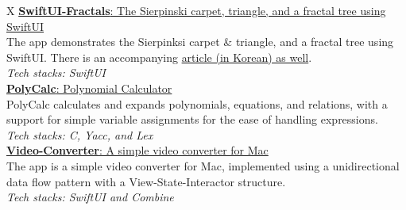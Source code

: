 \begin{tblr}{X}
  \href{https://github.com/Zeta611/SwiftUI-Fractals}{\textbf{SwiftUI-Fractals}: The Sierpinski carpet, triangle, and a fractal tree using SwiftUI}                                                                                                                                             \\
  The app demonstrates the Sierpinksi carpet \& triangle, and a fractal tree using SwiftUI. There is an accompanying \href{https://zetablog.io/posts/fractals-in-swiftui}{article (in Korean) as well}.                                                                                        \\
  \textit{Tech stacks: SwiftUI}                                                                                                                                                                                                                                                                \\[0.5\onelineskip]

  \href{https://github.com/Zeta611/polycalc}{\textbf{PolyCalc}: Polynomial Calculator}                                                                                                                                                                                                         \\
  PolyCalc calculates and expands polynomials, equations, and relations, with a support for simple variable assignments for the ease of handling expressions.                                                                                                                                  \\
  \textit{Tech stacks: C, Yacc, and Lex}                                                                                                                                                                                                                                                       \\[0.5\onelineskip]

  \href{https://github.com/Zeta611/Video-Converter}{\textbf{Video-Converter}: A simple video converter for Mac}                                                                                                                                                                                \\
  The app is a simple video converter for Mac, implemented using a unidirectional data flow pattern with a View-State-Interactor structure.                                                                                                                                                    \\
  \textit{Tech stacks: SwiftUI and Combine}                                                                                                                                                                                                                                                    \\[0.5\onelineskip]


\end{tblr}

